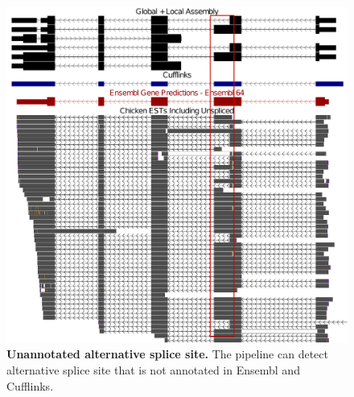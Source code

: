 \documentclass[10pt]{article}
\begin{document}
\begin{figure}[!ht]
\begin{center}
\includegraphics[width=5in]{alt_splice_site.pdf}
\end{center}
\caption{
{\bf Unannotated alternative splice site.}
The pipeline can detect alternative splice site that is not annotated in Ensembl and Cufflinks.
}
\label{alt_splice_site}
\end{figure}
\end{document}
